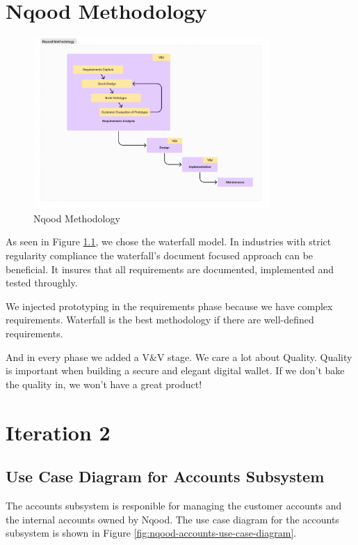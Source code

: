\documentclass[a4paper]{report}
\begin{document}
\chapter{Nqood Methodology}

\begin{figure}[h!]
    \centering
    \includegraphics[width=0.8\textwidth]{images/nqood-methodology.png}
    \caption{Nqood Methodology}
    \label{fig:nqood-methodology}
\end{figure}

As seen in Figure \ref{fig:nqood-methodology}, we chose the waterfall model. In industries with strict regularity compliance the waterfall's
document focused approach can be beneficial. It insures that all requirements are documented, implemented and tested
throughly.

We injected prototyping in the requirements phase because we have complex requirements. Waterfall is the best methodology if there are well-defined requirements.

And in every phase we added a V\&V stage. We care a lot about Quality. Quality is important when building a secure and elegant digital wallet. If we don't bake the quality in, we won't have a great product!

\chapter{Iteration 2}

\section{Use Case Diagram for Accounts Subsystem}

The accounts subsystem is responible for managing the customer accounts and the internal accounts owned by Nqood. The use case diagram for the accounts subsystem is shown in Figure \ref{fig:nqood-accounts-use-case-diagram}.
\end{document}
